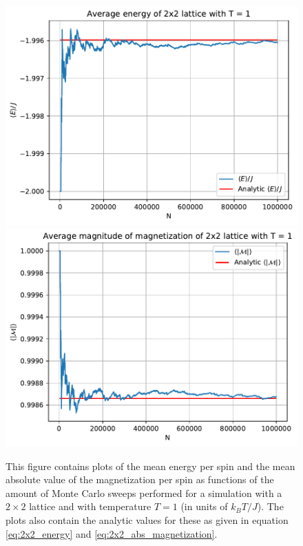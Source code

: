 \documentclass[reprint,english,notitlepage]{revtex4-1}  %
\begin{document}
\begin{figure}[H]
\centering
\includegraphics[width=\columnwidth]{../data/t10-2x2-E.pdf}
\includegraphics[width=\columnwidth]{../data/t10-2x2-|M|.pdf}
\caption{This figure contains plots of the mean energy per spin and the mean absolute value of the magnetization per spin as functions of the amount of Monte Carlo sweeps performed for a simulation with a $2\times 2$ lattice and with temperature $T=1$ (in units of $k_B T/J$). The plots also contain the analytic values for these as given in equation \eqref{eq:2x2_energy} and \eqref{eq:2x2_abs_magnetization}.} \label{fig:t10_2x2_energy_magnetization}
\end{figure}
\end{document}
